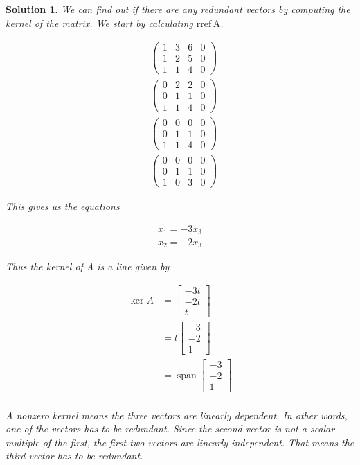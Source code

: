 \documentclass{article}
\newtheorem*{solution}{Solution}
\newcommand{\rref}[1]{\mathrm{rref \, #1}}
\DeclareMathOperator{\Span}{span}
\begin{document}
\begin{solution}
We can find out if there are any redundant vectors by computing the kernel of the matrix. We start by calculating $\rref{A}$.

\begin{align*}
& \left( \begin{array}{ccc|c}1 & 3 & 6 & 0 \\ 1 & 2 & 5 & 0 \\ 1 & 1 & 4 & 0\end{array} \right) \\
& \left( \begin{array}{ccc|c}0 & 2 & 2 & 0 \\ 0 & 1 & 1 & 0 \\ 1 & 1 & 4 & 0\end{array} \right) \\
& \left( \begin{array}{ccc|c}0 & 0 & 0 & 0 \\ 0 & 1 & 1 & 0 \\ 1 & 1 & 4 & 0\end{array} \right) \\
& \left( \begin{array}{ccc|c}0 & 0 & 0 & 0 \\ 0 & 1 & 1 & 0 \\ 1 & 0 & 3 & 0\end{array} \right)
\end{align*}

This gives us the equations

\begin{align*}
x_{1} = -3x_{3} \\
x_{2} = -2x_{3}
\end{align*}

Thus the kernel of A is a line given by

\begin{align*}
\ker A &= \begin{bmatrix} -3t \\ -2t \\ t \end{bmatrix} \\
&= t \begin{bmatrix} -3 \\ -2 \\ 1 \end{bmatrix} \\
&= \Span \begin{bmatrix} -3 \\ -2 \\ 1 \end{bmatrix} \\
\end{align*}

A nonzero kernel means the three vectors are linearly dependent. In other words, one of the vectors has to be redundant. Since the second vector is not a scalar multiple of the first, the first two vectors are linearly independent. That means the third vector has to be redundant.

\end{solution}
\end{document}
